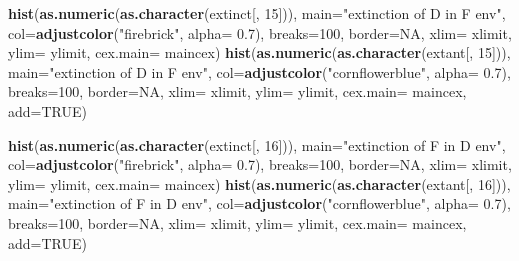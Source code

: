 \documentclass[]{book}
\newenvironment{Shaded}{\begin{snugshade}}{\end{snugshade}}
\newcommand{\KeywordTok}[1]{\textcolor[rgb]{0.13,0.29,0.53}{\textbf{{#1}}}}
\newcommand{\DataTypeTok}[1]{\textcolor[rgb]{0.13,0.29,0.53}{{#1}}}
\newcommand{\DecValTok}[1]{\textcolor[rgb]{0.00,0.00,0.81}{{#1}}}
\newcommand{\FloatTok}[1]{\textcolor[rgb]{0.00,0.00,0.81}{{#1}}}
\newcommand{\StringTok}[1]{\textcolor[rgb]{0.31,0.60,0.02}{{#1}}}
\newcommand{\OtherTok}[1]{\textcolor[rgb]{0.56,0.35,0.01}{{#1}}}
\newcommand{\NormalTok}[1]{{#1}}
\theoremstyle{definition}
\theoremstyle{definition}
\theoremstyle{remark}
\begin{document}
\begin{Shaded}
\begin{Highlighting}[]
\KeywordTok{hist}\NormalTok{(}\KeywordTok{as.numeric}\NormalTok{(}\KeywordTok{as.character}\NormalTok{(extinct[, }\DecValTok{15}\NormalTok{])), }\DataTypeTok{main=}\StringTok{"extinction of D in F env"}\NormalTok{, }\DataTypeTok{col=}\KeywordTok{adjustcolor}\NormalTok{(}\StringTok{"firebrick"}\NormalTok{, }\DataTypeTok{alpha=} \FloatTok{0.7}\NormalTok{), }\DataTypeTok{breaks=}\DecValTok{100}\NormalTok{, }\DataTypeTok{border=}\OtherTok{NA}\NormalTok{, }\DataTypeTok{xlim=}\NormalTok{ xlimit, }\DataTypeTok{ylim=}\NormalTok{ ylimit, }\DataTypeTok{cex.main=}\NormalTok{ maincex)}
\KeywordTok{hist}\NormalTok{(}\KeywordTok{as.numeric}\NormalTok{(}\KeywordTok{as.character}\NormalTok{(extant[, }\DecValTok{15}\NormalTok{])), }\DataTypeTok{main=}\StringTok{"extinction of D in F env"}\NormalTok{, }\DataTypeTok{col=}\KeywordTok{adjustcolor}\NormalTok{(}\StringTok{"cornflowerblue"}\NormalTok{, }\DataTypeTok{alpha=} \FloatTok{0.7}\NormalTok{), }\DataTypeTok{breaks=}\DecValTok{100}\NormalTok{, }\DataTypeTok{border=}\OtherTok{NA}\NormalTok{, }\DataTypeTok{xlim=}\NormalTok{ xlimit, }\DataTypeTok{ylim=}\NormalTok{ ylimit, }\DataTypeTok{cex.main=}\NormalTok{ maincex, }\DataTypeTok{add=}\OtherTok{TRUE}\NormalTok{)}

\KeywordTok{hist}\NormalTok{(}\KeywordTok{as.numeric}\NormalTok{(}\KeywordTok{as.character}\NormalTok{(extinct[, }\DecValTok{16}\NormalTok{])), }\DataTypeTok{main=}\StringTok{"extinction of F in D env"}\NormalTok{, }\DataTypeTok{col=}\KeywordTok{adjustcolor}\NormalTok{(}\StringTok{"firebrick"}\NormalTok{, }\DataTypeTok{alpha=} \FloatTok{0.7}\NormalTok{), }\DataTypeTok{breaks=}\DecValTok{100}\NormalTok{, }\DataTypeTok{border=}\OtherTok{NA}\NormalTok{, }\DataTypeTok{xlim=}\NormalTok{ xlimit, }\DataTypeTok{ylim=}\NormalTok{ ylimit, }\DataTypeTok{cex.main=}\NormalTok{ maincex)}
\KeywordTok{hist}\NormalTok{(}\KeywordTok{as.numeric}\NormalTok{(}\KeywordTok{as.character}\NormalTok{(extant[, }\DecValTok{16}\NormalTok{])), }\DataTypeTok{main=}\StringTok{"extinction of F in D env"}\NormalTok{, }\DataTypeTok{col=}\KeywordTok{adjustcolor}\NormalTok{(}\StringTok{"cornflowerblue"}\NormalTok{, }\DataTypeTok{alpha=} \FloatTok{0.7}\NormalTok{), }\DataTypeTok{breaks=}\DecValTok{100}\NormalTok{, }\DataTypeTok{border=}\OtherTok{NA}\NormalTok{, }\DataTypeTok{xlim=}\NormalTok{ xlimit, }\DataTypeTok{ylim=}\NormalTok{ ylimit, }\DataTypeTok{cex.main=}\NormalTok{ maincex, }\DataTypeTok{add=}\OtherTok{TRUE}\NormalTok{)}


\end{Highlighting}
\end{Shaded}
\end{document}
